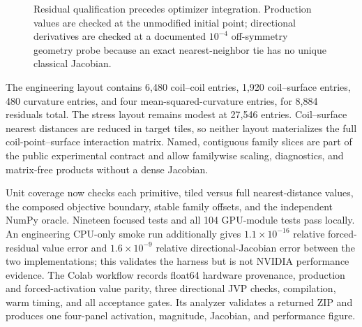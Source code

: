 \documentclass[11pt,a4paper]{article}
\begin{document}
\begin{figure}[htbp]
\centering
{}
\caption{Residual qualification precedes optimizer integration.  Production
values are checked at the unmodified initial point; directional derivatives are
checked at a documented $10^{-4}$ off-symmetry geometry probe because an exact
nearest-neighbor tie has no unique classical Jacobian.}
\label{fig:local-residual-boundary}
\end{figure}

The engineering layout contains 6,480 coil--coil entries, 1,920 coil--surface
entries, 480 curvature entries, and four mean-squared-curvature entries, for
8,884 residuals total.  The stress layout remains modest at 27,546 entries.
Coil--surface nearest distances are reduced in target tiles, so neither layout
materializes the full coil-point--surface interaction matrix.  Named, contiguous
family slices are part of the public experimental contract and allow familywise
scaling, diagnostics, and matrix-free products without a dense Jacobian.

Unit coverage now checks each primitive, tiled versus full nearest-distance
values, the composed objective boundary, stable family offsets, and the
independent NumPy oracle.  Nineteen focused tests and all 104 GPU-module tests
pass locally.  An engineering CPU-only smoke run additionally gives
$1.1\times10^{-16}$ relative
forced-residual value error and $1.6\times10^{-9}$ relative
directional-Jacobian error between the two
implementations; this validates the harness but is not NVIDIA performance
evidence.  The Colab workflow records float64 hardware provenance, production
and forced-activation value parity, three directional JVP checks, compilation,
warm timing, and all acceptance gates.  Its analyzer validates a returned ZIP
and produces one four-panel activation, magnitude, Jacobian, and performance
figure.
\end{document}
